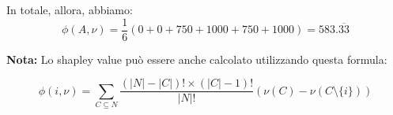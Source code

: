 In totale, allora, abbiamo:
\[
\phi(A,\nu) = \frac{1}{6}(0+0+750+1000+750+1000) = 583.\overline{33}
\]

\textbf{Nota:} Lo shapley value può essere anche calcolato utilizzando questa formula:

\[
    \phi(i, \nu) = \sum_{C \subseteq N} \frac{(|N|-|C|)! \times (|C| -1)!}{|N|!}(\nu(C) - \nu(C\setminus \{i\}))   
\]